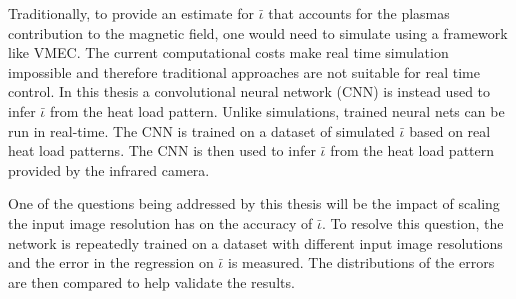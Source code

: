 Traditionally, to provide an estimate for $\bar{\iota}$ that accounts for the plasmas contribution to the magnetic field, one would need to simulate using a framework like VMEC. The current computational costs make real time simulation impossible and therefore traditional approaches are not suitable for real time control. In this thesis a convolutional neural network (CNN) is instead used to infer $\bar{\iota}$ from the heat load pattern. Unlike simulations, trained neural nets can be run in real-time. The CNN is trained on a dataset of simulated $\bar{\iota}$ based on real heat load patterns. The CNN is then used to infer $\bar{\iota}$ from the heat load pattern provided by the infrared camera.

One of the questions being addressed by this thesis will be the impact of scaling the input image resolution has on the accuracy of $\bar{\iota}$. To resolve this question, the network is repeatedly trained on a dataset with different input image resolutions and the error in the regression on $\bar{\iota}$ is measured. The distributions of the errors are then compared to help validate the results.